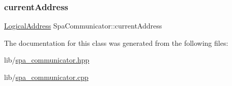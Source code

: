 \mbox{\label{classSpaCommunicator_a6c00e876564bddf214695d067c20a1f4}} 
\subsubsection{\texorpdfstring{current\+Address}{currentAddress}}
{\footnotesize\ttfamily \hyperlink{structLogicalAddress}{Logical\+Address} Spa\+Communicator\+::current\+Address\hspace{0.3cm}{\ttfamily [protected]}}



The documentation for this class was generated from the following files\+:\begin{DoxyCompactItemize}
\item 
lib/\hyperlink{spa__communicator_8hpp}{spa\+\_\+communicator.\+hpp}\item 
lib/\hyperlink{spa__communicator_8cpp}{spa\+\_\+communicator.\+cpp}\end{DoxyCompactItemize}
